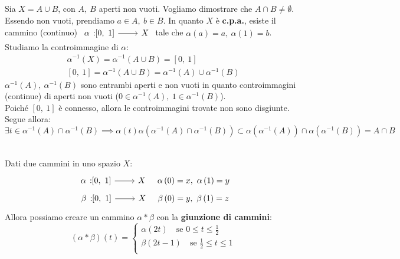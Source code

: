 \begin{demonstration}
	Sia $X=A\cup B$, con $A,\ B$ aperti non vuoti. Vogliamo dimostrare che $A\cap B\neq \emptyset$. Essendo non vuoti, prendiamo $a\in A,\ b\in B$. In quanto $X$ è \textbf{c.p.a.}, esiste il cammino (continuo) $\funz{\alpha}{\left[0,\ 1\right]}{X}$ tale che $\alpha\left(a\right)=a,\ \alpha\left(1\right)=b$.\\
	Studiamo la controimmagine di $\alpha$:
	\begin{gather*}
		\alpha^{-1}\left(X\right)=\alpha^{-1}\left(A\cup B\right)=\left[0,\ 1\right]\\
		\left[0,\ 1\right]=\alpha^{-1}\left(A\cup B\right)=\alpha^{-1}\left(A\right)\cup \alpha^{-1}\left(B\right)
	\end{gather*}
$\alpha^{-1}\left(A\right),\ \alpha^{-1}\left(B\right)$ sono entrambi aperti e non vuoti in quanto controimmagini (continue) di aperti non vuoti ($0\in \alpha^{-1}\left(A\right),\ 1\in \alpha^{-1}\left(B\right)$).\\
Poiché $\left[0,\ 1\right]$ è connesso, allora le controimmagini trovate non sono disgiunte. Segue allora:
\begin{equation*}
\exists t\in \alpha^{-1}\left(A\right)\cap \alpha^{-1}\left(B\right)\implies \alpha\left(t\right)\alpha\left(\alpha^{-1}\left(A\right)\cap \alpha^{-1}\left(B\right)\right)\subset\alpha\left(\alpha^{-1}\left(A\right)\right)\cap\alpha\left(\alpha^{-1}\left(B\right)\right)=A\cap B
\end{equation*}
\end{demonstration}
\begin{define}~{}\\
	Dati due cammini in uno spazio $X$:
	\begin{gather*}
		\funz{\alpha}{\left[0,\ 1\right]}{X}\quad \alpha\left(0\right)=x,\ \alpha\left(1\right)=y\\
		\funz{\beta}{\left[0,\ 1\right]}{X}\quad \beta\left(0\right)=y,\ \beta\left(1\right)=z
	\end{gather*}
	Allora possiamo creare un cammino $\alpha \ast \beta$ con la \textbf{giunzione di cammini}:
	\begin{equation}
		\left(\alpha\ast\beta\right)\left(t\right)=\begin{cases}
			\alpha\left(2t\right)\quad\text{se }0\leq t\leq \frac{1}{2}\\
			\beta\left(2t-1\right)\quad\text{se }\frac{1}{2}\leq t\leq 1\\	
		\end{cases}
	\end{equation}
\vspace{-6mm}
\end{define}
